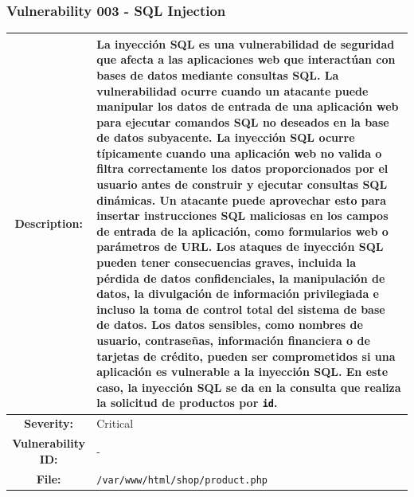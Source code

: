 \documentclass[a4paper]{article} %
\begin{document}
    \clearpage

    \subsubsection{\textbf{Vulnerability 003 - SQL Injection}}
    \begin{table}[htbp]
        \begin{tabularx}{\textwidth}{|c|X|}
            \hline
            \cellcolor{lightgray}\textbf{Description:} & 
            {
                La inyección SQL es una vulnerabilidad de seguridad que afecta a las aplicaciones web que interactúan con bases de datos mediante consultas SQL. La vulnerabilidad ocurre cuando un atacante puede manipular los datos de entrada de una aplicación web para ejecutar comandos SQL no deseados en la base de datos subyacente.
                \newline\newline
                La inyección SQL ocurre típicamente cuando una aplicación web no valida o filtra correctamente los datos proporcionados por el usuario antes de construir y ejecutar consultas SQL dinámicas. Un atacante puede aprovechar esto para insertar instrucciones SQL maliciosas en los campos de entrada de la aplicación, como formularios web o parámetros de URL.
                \newline\newline
                Los ataques de inyección SQL pueden tener consecuencias graves, incluida la pérdida de datos confidenciales, la manipulación de datos, la divulgación de información privilegiada e incluso la toma de control total del sistema de base de datos. Los datos sensibles, como nombres de usuario, contraseñas, información financiera o de tarjetas de crédito, pueden ser comprometidos si una aplicación es vulnerable a la inyección SQL.
                \newline\newline
                En este caso, la inyección SQL se da en la consulta que realiza la solicitud de productos por \texttt{id}.
            } \\
            \hline
            \cellcolor{lightgray}\textbf{Severity:} &
            {
                Critical
            } \\
            \hline
            \cellcolor{lightgray}\textbf{Vulnerability ID:} &
            {-} \\
            \hline
            \cellcolor{lightgray}\textbf{File:} &
            {
                \texttt{/var/www/html/shop/product.php}
}
\end{tabularx}
\end{table}
\end{document}
